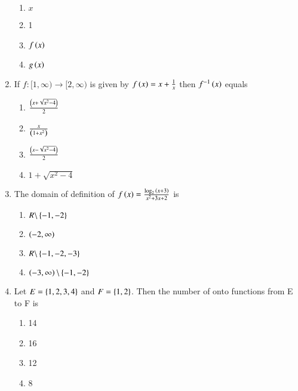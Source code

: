 \documentclass[journal]{IEEEtran}
\begin{document}
\begin{enumerate}
\hfill{}

\begin{multicols}{2}
	\begin{enumerate}
		\item $x$ 
		\item 1
		\item $f\left(x\right)$ 
		\item $g\left(x\right)$
	\end{enumerate}
\end{multicols}

\item If $f:[1,\infty)\to[2,\infty)$ is given by $f\left(x\right)=x+\frac{1}{x}$ then $f^{-1}\left(x\right)$ equals

\hfill{}

\begin{multicols}{2}
	\begin{enumerate}
		\item $\frac{\left(x+\sqrt{x^{2}-4}\right)}{2}$ 
		\item $\frac{x}{\left(1+x^{2}\right)}$
		\item $\frac{\left(x-\sqrt{x^{2}-4}\right)}{2}$ 
		\item $1+\sqrt{x^{2}-4}$
	\end{enumerate}
\end{multicols}

\item The domain of definition of $f\left(x\right)=\frac{\log_{2}{\left(x+3\right)}}{x^{2}+3x+2}$ is

\hfill{}

\begin{multicols}{2}
	\begin{enumerate}
		\item $R \backslash \left\{-1,-2\right\}$ 
		\item $\left(-2,\infty\right)$
		\item $R \backslash \left\{-1,-2,-3\right\}$ 
		\item $\left(-3,\infty\right)\backslash\left\{-1,-2\right\}$
	\end{enumerate}
\end{multicols}
                                                                                        
\item Let $E=\left\{1,2,3,4\right\}$ and $F=\left\{1,2\right\}$. Then the number of onto functions from E to F is

\hfill{}

\begin{multicols}{4}
	\begin{enumerate}
		\item 14 
		\item 16 
		\item 12 
		\item 8
	\end{enumerate}
\end{multicols}


\end{enumerate}
\end{document}
